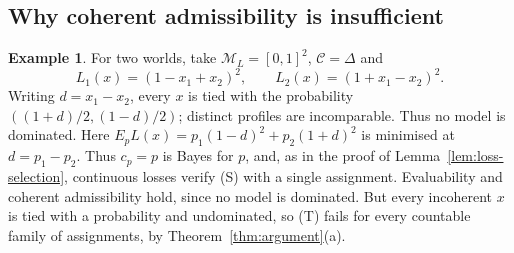 \documentclass[11pt]{article}
\theoremstyle{definition}
\newtheorem{example}[theorem]{Example}
\theoremstyle{remark}
\newcommand{\M}{\mathcal M}
\newcommand{\C}{\mathcal C}
\begin{document}
\subsection{Why coherent admissibility is insufficient}
\begin{example}\label{ex:ties}
For two worlds, take $\M_L=[0,1]^2$, $\C=\Delta$ and
\[
L_1(x)=(1-x_1+x_2)^2,\qquad L_2(x)=(1+x_1-x_2)^2.
\]
Writing $d=x_1-x_2$, every $x$ is tied with the probability $((1+d)/2,(1-d)/2)$; distinct profiles are incomparable. Thus no model is dominated. Here $E_pL(x)=p_1(1-d)^2+p_2(1+d)^2$ is minimised at $d=p_1-p_2$. {Thus $c_p=p$ is Bayes for $p$, and, as in the proof of Lemma~\ref{lem:loss-selection}, continuous losses verify {(S)} with a single assignment. Evaluability and coherent admissibility hold, since no model is dominated. But every incoherent $x$ is tied with a probability and undominated, so {(T)} fails for every countable family of assignments, by Theorem~\ref{thm:argument}(a).}
\end{example}
\end{document}
